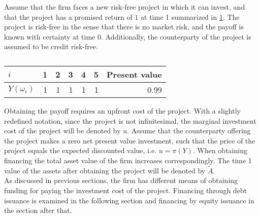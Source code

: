 \documentclass[main.tex]{subfiles}
\begin{document}
    Assume that the firm faces a new risk-free project in which it can invest,
    and that the project has a promised return of $\num{1}$ at time 1 summarized in \cref{tbl:single-period-simple-derivative-payoff}.
    The project is risk-free in the sense that there is no market risk,
    and the payoff is known with certainty at time 0.
    Additionally, the counterparty of the project is assumed to be credit risk-free.
        \begin{table}[H]
            \centering
            \begin{tabular}{l|rrrrr||r}
                $i$ & 1 & 2 & 3 & 4 & 5 & Present value\\
                \hline
                $Y(\omega_{i})$ & 
                    \num{1} & \num{1} & \num{1} & \num{1} & \num{1} & \num{0.99}
            \end{tabular}
            \caption{}
            \label{tbl:single-period-simple-derivative-payoff}
        \end{table}
    Obtaining the payoff requires an upfront cost of the project.
    With a slightly redefined notation, since the project is not infinitesimal,
    the marginal investment cost of the project will be denoted by $u$.
    Assume that the counterparty offering the project makes a zero net present value investment, 
    such that the price of the project equals the expected discounted value, i.e. $u = \pi(Y)$.
    When obtaining financing the total asset value of the firm increases correspondingly.
    The time 1 value of the assets after obtaining the project will be denoted by $\tilde{A}$.
    \\
    As discussed in previous sections, the firm has different means of obtaining funding
    for paying the investment cost of the project.
    Financing through debt issuance is examined in the following section 
    and financing by equity issuance in the section after that.
\end{document}
